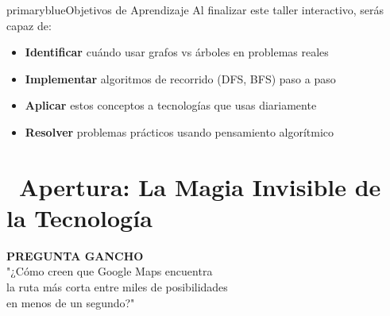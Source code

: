\documentclass[12pt,a4paper]{article}
\begin{document}
	\begin{presentationbox}{primaryblue}{Objetivos de Aprendizaje}
		Al finalizar este taller interactivo, serás capaz de:
		\begin{itemize}[leftmargin=2cm, itemsep=0.5cm]
			\item[\textcolor{secondarygreen}{\faCheck}] \textbf{Identificar} cuándo usar grafos vs árboles en problemas reales
			\item[\textcolor{secondarygreen}{\faCheck}] \textbf{Implementar} algoritmos de recorrido (DFS, BFS) paso a paso
			\item[\textcolor{secondarygreen}{\faCheck}] \textbf{Aplicar} estos conceptos a tecnologías que usas diariamente
			\item[\textcolor{secondarygreen}{\faCheck}] \textbf{Resolver} problemas prácticos usando pensamiento algorítmico
		\end{itemize}
	\end{presentationbox}
	
	\newpage
	
	\section*{\faRocket\ Apertura: La Magia Invisible de la Tecnología}
	
	
	\begin{center}
		\begin{tcolorbox}[colback=warningorange!10, colframe=warningorange, rounded corners, width=0.9\textwidth]
			\centering
			\LARGE\textbf{PREGUNTA GANCHO}\\[0.5cm]
			\Large "¿Cómo creen que Google Maps encuentra\\
			la ruta más corta entre miles de posibilidades\\
			en menos de un segundo?"
		\end{tcolorbox}
	\end{center}
	
	\vspace{0.5cm}
	
\end{document}
